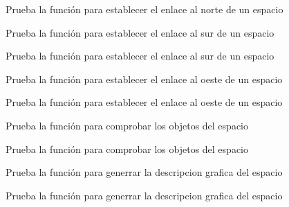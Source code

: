 \begin{DoxyRefList}
Prueba la función para establecer el enlace al norte de un espacio  
\item[\label{test__test000036}%
\Hypertarget{test__test000036}%
Member \hyperlink{space__test_8c_ab2626f0045b225c79a8c5d56298e2065}{test3\+\_\+space\+\_\+set\+\_\+south} ()]Prueba la función para establecer el enlace al sur de un espacio 

Prueba la función para establecer el enlace al sur de un espacio  
\item[\label{test__test000042}%
\Hypertarget{test__test000042}%
Member \hyperlink{space__test_8c_a8150758940559ef958649a2fab36bee0}{test3\+\_\+space\+\_\+set\+\_\+west} ()]Prueba la función para establecer el enlace al oeste de un espacio 

Prueba la función para establecer el enlace al oeste de un espacio  
\item[\label{test__test000081}%
\Hypertarget{test__test000081}%
Member \hyperlink{space__test_8c_a45741ea97d9588fd445eb537afe2cd95}{test4\+\_\+space\+\_\+check\+\_\+object} ()]Prueba la función para comprobar los objetos del espacio 

Prueba la función para comprobar los objetos del espacio  
\item[\label{test__test000074}%
\Hypertarget{test__test000074}%
Member \hyperlink{space__test_8c_a187d250c44277a39ca324c773e62544d}{test4\+\_\+space\+\_\+set\+\_\+gdesc} ()]Prueba la función para generrar la descripcion grafica del espacio 

Prueba la función para generrar la descripcion grafica del espacio 
\end{DoxyRefList}